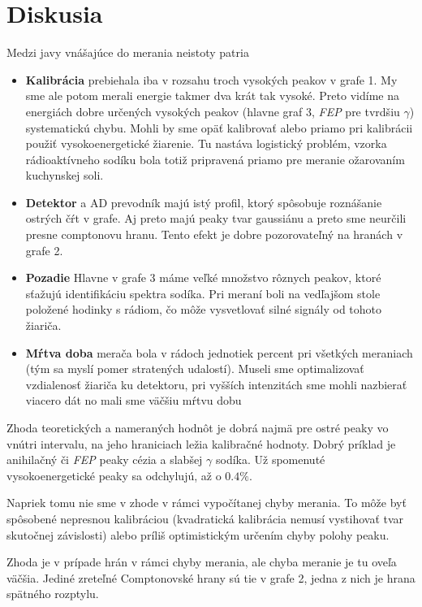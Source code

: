 \documentclass[a4paper, 10pt]{article}
\begin{document}
\section*{Diskusia}
Medzi javy vnášajúce do merania neistoty patria
\begin{itemize}
\item \textbf{Kalibrácia} prebiehala iba v rozsahu troch vysokých peakov v grafe 1. My sme ale potom merali energie takmer dva krát tak vysoké. Preto vidíme na energiách dobre určených vysokých peakov (hlavne graf 3, \textit{FEP} pre tvrdšiu $\gamma$) systematickú chybu. Mohli by sme opäť kalibrovať alebo priamo pri kalibrácii použiť vysokoenergetické žiarenie. Tu nastáva logistický problém, vzorka rádioaktívneho sodíku bola totiž pripravená priamo pre meranie ožarovaním kuchynskej soli.
\item \textbf{Detektor} a AD prevodník majú istý profil, ktorý spôsobuje roznášanie ostrých čŕt v grafe. Aj preto majú peaky tvar gaussiánu a preto sme neurčili presne comptonovu hranu. Tento efekt je dobre pozorovateľný na hranách v grafe 2.
\item \textbf{Pozadie} Hlavne v grafe 3 máme veľké množstvo rôznych peakov, ktoré sťažujú identifikáciu spektra sodíka. Pri meraní boli na vedľajšom stole položené hodinky s rádiom, čo môže vysvetlovať silné signály od tohoto žiariča.
\item \textbf{Mŕtva doba} merača bola v rádoch jednotiek percent pri všetkých meraniach (tým sa myslí pomer stratených udalostí). Museli sme optimalizovať vzdialenosť žiariča ku detektoru, pri vyšších intenzitách sme mohli nazbierať viacero dát no mali sme väčšiu mŕtvu dobu
\end{itemize}

Zhoda teoretických a nameraných hodnôt je dobrá najmä pre ostré peaky vo vnútri intervalu, na jeho hraniciach ležia kalibračné hodnoty. Dobrý príklad je anihilačný či \textit{FEP} peaky cézia a slabšej $\gamma$ sodíka. Už spomenuté vysokoenergetické peaky sa odchylujú, až o $0.4\%$. 

Napriek tomu nie sme v zhode v rámci vypočítanej chyby merania. To môže byť spôsobené nepresnou kalibráciou (kvadratická kalibrácia nemusí vystihovať tvar skutočnej závislosti) alebo príliš optimistickým určením chyby polohy peaku.

Zhoda je v prípade hrán v rámci chyby merania, ale chyba meranie je tu oveľa väčšia. Jediné zreteľné Comptonovské hrany sú tie v grafe 2, jedna z nich je hrana spätného rozptylu. 
\end{document}
